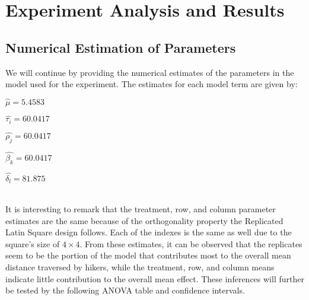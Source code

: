 

\chapter{Experiment Analysis and Results}
\label{chapter3}
\thispagestyle{empty}

\section{Numerical Estimation of Parameters}
We will continue by providing the numerical estimates of the parameters in the model used for the experiment. The estimates for each model term are given by:\\
\centerline{$\hat{\mu} = 5.4583$}
\centerline{$\hat{\tau_{i}} = 60.0417$}
\centerline{$\hat{\rho_{j}} = 60.0417$}
\centerline{$\hat{\beta_{k}} = 60.0417$}
\centerline{$\hat{\delta_{l}} = 81.875$}\\
It is interesting to remark that the treatment, row, and column parameter estimates are the same because of the orthogonality property the Replicated Latin Square design follows. Each of the indexes is the same as well due to the square's size of $4 \times 4$. From these estimates, it can be observed that the replicates seem to be the portion of the model that contributes most to the overall mean distance traversed by hikers, while the treatment, row, and column means indicate little contribution to the overall mean effect. These inferences will further be tested by the following ANOVA table and confidence intervals.

